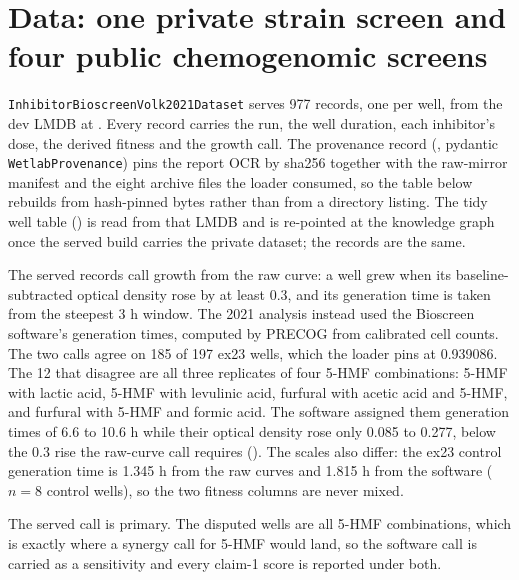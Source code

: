 
\section{Data: one private strain screen and four public chemogenomic screens}
\label{sec:data}

 \texttt{InhibitorBioscreenVolk2021Dataset} serves 977
records, one per well, from the dev LMDB at
. Every record carries
the run, the well duration, each inhibitor's dose, the derived fitness and the growth
call. The provenance record
(, pydantic \texttt{WetlabProvenance}) pins the
report OCR by sha256 together with the raw-mirror manifest and the eight archive files
the loader consumed, so the table below rebuilds from hash-pinned bytes rather than from
a directory listing. The tidy well table
() is read from that LMDB and is re-pointed at the
knowledge graph once the served build carries the private dataset; the records are the
same.

 The served records call growth from the
raw curve: a well grew when its baseline-subtracted optical density rose by at least
0.3, and its generation time is taken from the steepest 3 h window. The 2021 analysis
instead used the Bioscreen software's generation times, computed by PRECOG from
calibrated cell counts.
The two calls agree on 185 of 197 ex23 wells, which the loader pins at 0.939086. The 12
that disagree are all three replicates of four 5-HMF combinations: 5-HMF with lactic
acid, 5-HMF with levulinic acid, furfural with acetic acid and 5-HMF, and furfural with
5-HMF and formic acid. The software assigned them generation times of 6.6 to 10.6 h
while their optical density rose only 0.085 to 0.277, below the 0.3 rise the raw-curve
call requires (). The scales also differ:
the ex23 control generation time is 1.345 h from the raw curves and 1.815 h from the
software ($n = 8$ control wells), so the two fitness columns are never mixed.

The served call is primary. The disputed wells are all 5-HMF combinations, which is
exactly where a synergy call for 5-HMF would land, so the software call is carried as a
sensitivity and every claim-1 score is reported under both.

